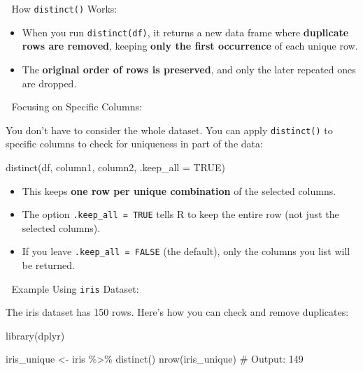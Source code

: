 \documentclass[
  man,
  floatsintext,
  longtable,
  nolmodern,
  notxfonts,
  notimes,
  colorlinks=true,linkcolor=blue,citecolor=blue,urlcolor=blue]{apa7}
\newenvironment{Shaded}{\begin{snugshade}}{\end{snugshade}}
\newcommand{\AttributeTok}[1]{\textcolor[rgb]{0.40,0.45,0.13}{#1}}
\newcommand{\CommentTok}[1]{\textcolor[rgb]{0.37,0.37,0.37}{#1}}
\newcommand{\ConstantTok}[1]{\textcolor[rgb]{0.56,0.35,0.01}{#1}}
\newcommand{\FunctionTok}[1]{\textcolor[rgb]{0.28,0.35,0.67}{#1}}
\newcommand{\NormalTok}[1]{\textcolor[rgb]{0.00,0.23,0.31}{#1}}
\newcommand{\OtherTok}[1]{\textcolor[rgb]{0.00,0.23,0.31}{#1}}
\newcommand{\SpecialCharTok}[1]{\textcolor[rgb]{0.37,0.37,0.37}{#1}}
\providecommand{\tightlist}{%
  \setlength{\itemsep}{0pt}\setlength{\parskip}{0pt}}
\begin{document}
🔹 How \texttt{distinct()} Works:

\begin{itemize}
\tightlist
\item
  When you run \texttt{distinct(df)}, it returns a new data frame where
  \textbf{duplicate rows are removed}, keeping \textbf{only the first
  occurrence} of each unique row.
\item
  The \textbf{original order of rows is preserved}, and only the later
  repeated ones are dropped.
\end{itemize}

🔹 Focusing on Specific Columns:

You don't have to consider the whole dataset. You can apply
\texttt{distinct()} to specific columns to check for uniqueness in part
of the data:

\begin{Shaded}
\begin{Highlighting}[]
\FunctionTok{distinct}\NormalTok{(df, column1, column2, }\AttributeTok{.keep\_all =} \ConstantTok{TRUE}\NormalTok{)}
\end{Highlighting}
\end{Shaded}

\begin{itemize}
\tightlist
\item
  This keeps \textbf{one row per unique combination} of the selected
  columns.
\item
  The option \texttt{.keep\_all\ =\ TRUE} tells R to keep the entire row
  (not just the selected columns).
\item
  If you leave \texttt{.keep\_all\ =\ FALSE} (the default), only the
  columns you list will be returned.
\end{itemize}

🔹 Example Using \texttt{iris} Dataset:

The iris dataset has 150 rows. Here's how you can check and remove
duplicates:

\begin{Shaded}
\begin{Highlighting}[]
\FunctionTok{library}\NormalTok{(dplyr)}

\NormalTok{iris\_unique }\OtherTok{\textless{}{-}}\NormalTok{ iris }\SpecialCharTok{\%\textgreater{}\%} \FunctionTok{distinct}\NormalTok{()}
\FunctionTok{nrow}\NormalTok{(iris\_unique)}
\CommentTok{\# Output: 149}
\end{Highlighting}
\end{Shaded}
\end{document}
